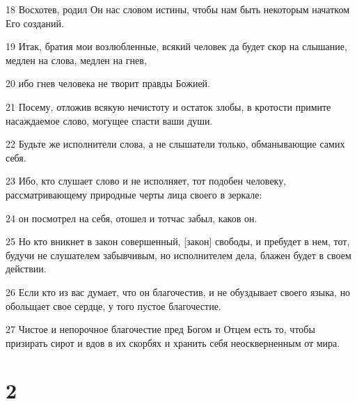 \par 18 Восхотев, родил Он нас словом истины, чтобы нам быть некоторым начатком Его созданий.
\par 19 Итак, братия мои возлюбленные, всякий человек да будет скор на слышание, медлен на слова, медлен на гнев,
\par 20 ибо гнев человека не творит правды Божией.
\par 21 Посему, отложив всякую нечистоту и остаток злобы, в кротости примите насаждаемое слово, могущее спасти ваши души.
\par 22 Будьте же исполнители слова, а не слышатели только, обманывающие самих себя.
\par 23 Ибо, кто слушает слово и не исполняет, тот подобен человеку, рассматривающему природные черты лица своего в зеркале:
\par 24 он посмотрел на себя, отошел и тотчас забыл, каков он.
\par 25 Но кто вникнет в закон совершенный, [закон] свободы, и пребудет в нем, тот, будучи не слушателем забывчивым, но исполнителем дела, блажен будет в своем действии.
\par 26 Если кто из вас думает, что он благочестив, и не обуздывает своего языка, но обольщает свое сердце, у того пустое благочестие.
\par 27 Чистое и непорочное благочестие пред Богом и Отцем есть то, чтобы призирать сирот и вдов в их скорбях и хранить себя неоскверненным от мира.

\chapter{2}

